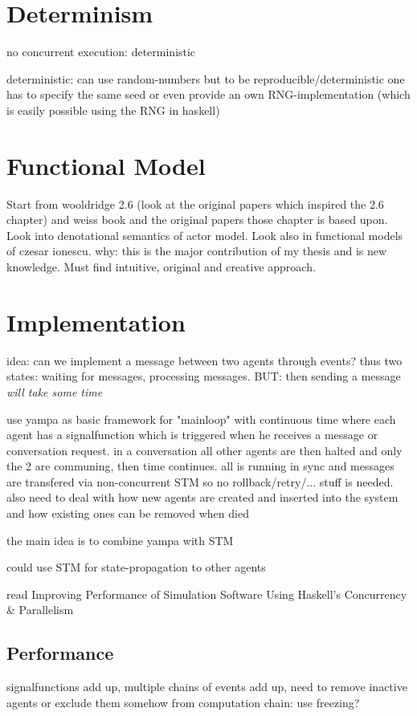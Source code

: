 \documentclass{article}
\begin{document}
\section{Determinism}
no concurrent execution: deterministic

deterministic: can use random-numbers but to be reproducible/deterministic one has to specify the same seed or even provide an own RNG-implementation (which is easily possible using the RNG in haskell)

\section{Functional Model}
Start from wooldridge 2.6 (look at the original papers which inspired the 2.6 chapter) and weiss book and the original papers those chapter is based upon. Look into denotational semantics of actor model. Look also in functional models of czesar ionescu. why: this is the major contribution of my thesis and is new knowledge. Must find intuitive, original and creative approach. \\

\section{Implementation}
idea: can we implement a message between two agents through events? thus two states: waiting for messages, processing messages. BUT: then sending a message \textit{will take some time}

use yampa as basic framework for "mainloop" with continuous time where each agent has a signalfunction which is triggered when he receives a message or conversation request. in a conversation all other agents are then halted and only the 2 are communing, then time continues. all is running in sync and messages are transfered via non-concurrent STM so no rollback/retry/... stuff is needed. also need to deal with how new agents are created and inserted into the system and how existing ones can be removed when died

the main idea is to combine yampa with STM

could use STM for state-propagation to other agents

read Improving Performance of Simulation Software Using Haskell’s Concurrency \& Parallelism

\subsection{Performance}

signalfunctions add up, multiple chains of events add up, need to remove inactive agents or exclude them somehow from computation chain: use freezing?





\end{document}
